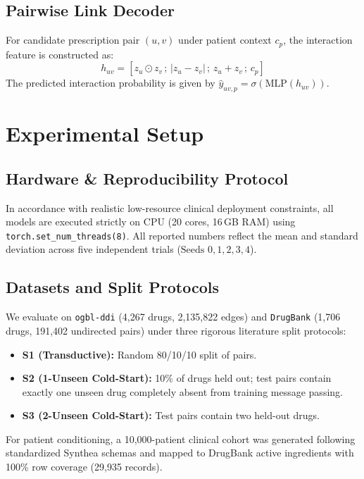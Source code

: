\documentclass[conference]{IEEEtran}
\begin{document}
\subsection{Pairwise Link Decoder}
For candidate prescription pair $(u, v)$ under patient context $c_p$, the interaction feature is constructed as:
\begin{equation}
h_{uv} = [z_u \odot z_v \,;\, |z_u - z_v| \,;\, z_u + z_v \,;\, c_p]
\end{equation}
The predicted interaction probability is given by $\hat{y}_{uv, p} = \sigma(\text{MLP}(h_{uv}))$.

\section{Experimental Setup}
\subsection{Hardware \& Reproducibility Protocol}
In accordance with realistic low-resource clinical deployment constraints, all models are executed strictly on CPU (20 cores, 16\,GB RAM) using \texttt{torch.set\_num\_threads(8)}. All reported numbers reflect the mean and standard deviation across five independent trials ($\text{Seeds } 0, 1, 2, 3, 4$).

\subsection{Datasets and Split Protocols}
We evaluate on \texttt{ogbl-ddi} (4,267 drugs, 2,135,822 edges) and \texttt{DrugBank} (1,706 drugs, 191,402 undirected pairs) under three rigorous literature split protocols:
\begin{itemize}
    \item \textbf{S1 (Transductive):} Random 80/10/10 split of pairs.
    \item \textbf{S2 (1-Unseen Cold-Start):} 10\% of drugs held out; test pairs contain exactly one unseen drug completely absent from training message passing.
    \item \textbf{S3 (2-Unseen Cold-Start):} Test pairs contain two held-out drugs.
\end{itemize}
For patient conditioning, a 10,000-patient clinical cohort was generated following standardized Synthea schemas and mapped to DrugBank active ingredients with 100\% row coverage (29,935 records).


\end{document}
